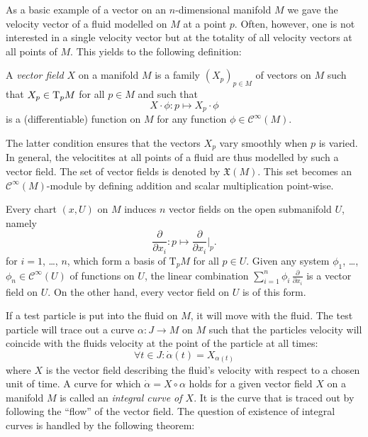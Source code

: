 As a basic example of a vector on an $n$-dimensional manifold $M$ we gave the velocity vector of a fluid modelled on $M$ at a point $p$. Often, however,
one is not interested
in a single velocity vector but at the totality of all velocity vectors at all
points of $M$. This yields to the following definition:

\begin{dfn}
  A \emph{vector field $X$} on a manifold $M$ is a family $(X_p)_{p \in M}$
  of vectors on $M$ such that $X_p \in \mathrm T_p M$ for all $p \in M$ and such
  that
  \[
    X \cdot \phi\colon p \mapsto X_p \cdot \phi
  \]
  is a (differentiable) function on $M$ for any function $\phi \in \mathcal
  C^\infty(M)$.
\end{dfn}
The latter condition ensures that the vectors $X_p$ vary smoothly when $p$ is
varied. In general, the velocitites at all points of a fluid are thus modelled
by such a vector field. The set of vector fields is denoted by $\mathfrak X(M)$.
This set becomes an $\mathcal C^\infty(M)$-module by defining addition and
scalar multiplication point-wise.

Every chart $(x, U)$ on $M$ induces $n$ vector fields on the open submanifold
$U$, namely
\[
  \frac{\partial}{\partial x_i}\colon p \mapsto \frac{\partial}{\partial x_i}|_p.
\]
for $i = 1$, \dots, $n$, which form a basis of $\mathrm T_p M$ for all $p \in U$.
Given any system $\phi_1$, \dots, $\phi_n \in \mathcal C^\infty(U)$ of functions
on $U$, the linear combination $\sum_{i = 1}^n \phi_i \, \frac{\partial}{\partial x_i}$
is a vector field on $U$. On the other hand, every vector field on $U$ is of this
form.

If a test particle is put into the fluid on $M$, it will move with the fluid.
The test particle will trace out a curve $\alpha\colon J \to M$ on $M$ such that
the particles velocity will coincide with the fluids velocity at the point of
the particle at all times:
\[
  \forall t \in J: \dot\alpha(t) = X_{\alpha(t)}
\]
where $X$ is the vector field describing the fluid's velocity with respect to
a chosen unit of time. A curve for which $\dot \alpha = X \circ \alpha$ holds
for a given vector field $X$ on a manifold $M$ is called an \emph{integral
curve of $X$}. It is the curve that is traced out by following the ``flow'' of
the vector field. The question of existence of integral curves is handled by
the following theorem:

